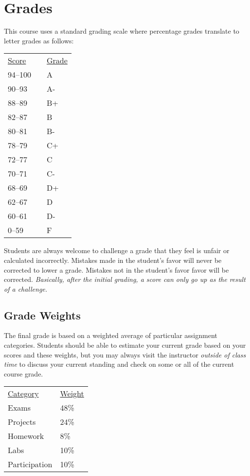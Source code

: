 \documentclass[10pt]{article}
\begin{document}
\section{Grades}

This course uses a standard grading scale where percentage grades translate to letter grades as follows:

\begin{center}
\begin{small}
\begin{tabular}{lcl}
\underline{Score} & & \underline{Grade} \\
94--100 & & A \\
90--93 & & A- \\
88--89 & & B+ \\
82--87 & & B \\
80--81 & & B- \\
78--79 & & C+ \\
72--77 & & C \\
70--71 & & C- \\
68--69 & & D+ \\
62--67 & & D \\
60--61 & & D- \\
0--59 & & F
\end{tabular}
\end{small}
\end{center}


Students are always welcome to challenge a grade that they feel is unfair or calculated incorrectly.  Mistakes made in the student's favor will never be corrected to lower a grade.  Mistakes not in the student's favor favor will be corrected.  \textit{Basically, after the initial grading, a score can only go up as the result of a challenge.}



\subsection{Grade Weights}

The final grade is based on a weighted average of particular assignment categories.  Students should be able to estimate your current grade based on your scores and these weights, but you may always visit the instructor \textit{outside of class time} to discuss your current standing and check on some or all of the current course grade.

\begin{center}
  \begin{tabular}{ll}
  \underline{Category} & \underline{Weight} \\
    Exams & 48\% \\ %
    Projects & 24\% \\ %
    Homework & 8\% \\ %
    Labs & 10\% \\ %
    Participation & 10\%
  \end{tabular}
\end{center}
\end{document}
